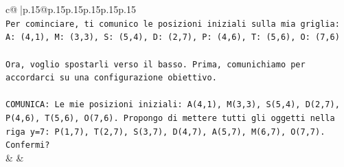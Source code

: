 \documentclass{article}
\begin{document}
{\begin{supertabular}{c@{$\;$}|p{.15\linewidth}@{}p{.15\linewidth}p{.15\linewidth}p{.15\linewidth}p{.15\linewidth}p{.15\linewidth}}
{{{\\ 
\texttt{Per cominciare, ti comunico le posizioni iniziali sulla mia griglia:} \\
\texttt{A: (4,1), M: (3,3), S: (5,4), D: (2,7), P: (4,6), T: (5,6), O: (7,6)} \\
\\ 
\texttt{Ora, voglio spostarli verso il basso. Prima, comunichiamo per accordarci su una configurazione obiettivo.} \\
\\ 
\texttt{COMUNICA: Le mie posizioni iniziali: A(4,1), M(3,3), S(5,4), D(2,7), P(4,6), T(5,6), O(7,6). Propongo di mettere tutti gli oggetti nella riga y=7: P(1,7), T(2,7), S(3,7), D(4,7), A(5,7), M(6,7), O(7,7). Confermi?} \\
            }
        }
    }
    & & \\ \\


\end{supertabular}}
\end{document}

